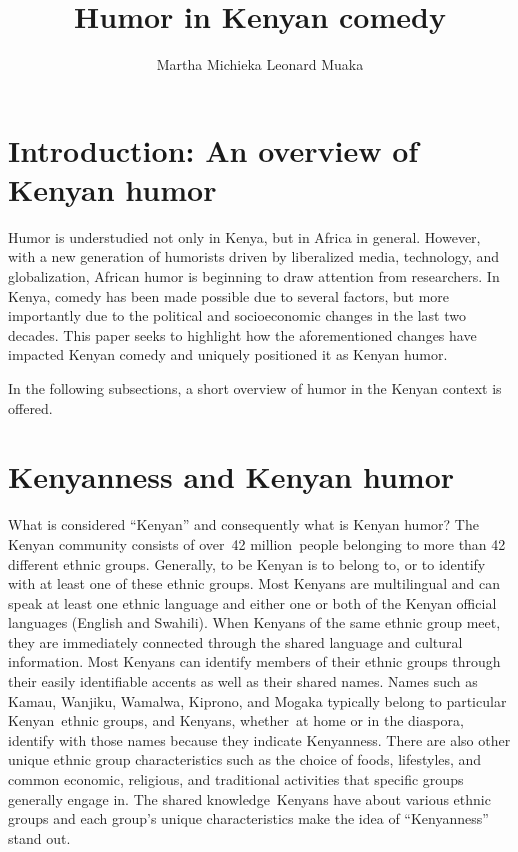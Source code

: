 \documentclass[output=paper]{langsci/langscibook}
\title{Humor in Kenyan comedy}
\author{%
 Martha Michieka   \affiliation{ East Tennessee State University}
 Leonard Muaka\affiliation{Winston Salem State University, North Carolina}\lastand 
}
\begin{document}
 

\section{ Introduction: An overview of Kenyan humor}

Humor is understudied not only in Kenya, but in Africa in general. However, with a new generation of humorists driven by liberalized media, technology, and globalization, African humor is beginning to draw attention from researchers. In Kenya, comedy has been made possible due to several factors, but more importantly due to the political and socioeconomic changes in the last two decades. This paper seeks to highlight how the aforementioned changes have impacted Kenyan comedy and uniquely positioned it as Kenyan humor. 

In the following subsections, a short overview of humor in the Kenyan context is offered.\textbf{ \\
}

\section{ Kenyanness and Kenyan humor\\
}
\begin{styleListParagraph}
What is considered “Kenyan” and consequently what is Kenyan humor? The Kenyan community consists of over~42 million~people belonging to more than 42 different ethnic groups. Generally, to be Kenyan is to belong to, or to identify with at least one of these ethnic groups. Most Kenyans are multilingual and can speak at least one ethnic language and either one or both of the Kenyan official languages (English and Swahili). When Kenyans of the same ethnic group meet, they are immediately connected through the shared language and cultural information. Most Kenyans can identify members of their ethnic groups through their easily identifiable accents as well as their shared names. Names such as Kamau, Wanjiku, Wamalwa, Kiprono, and Mogaka typically belong to particular Kenyan~ethnic groups, and Kenyans, whether~at home or in the diaspora, identify with those names because they indicate Kenyanness. There are also other unique ethnic group characteristics such as the choice of foods, lifestyles, and common economic, religious, and traditional activities that specific groups generally engage in. The shared knowledge~Kenyans have about various ethnic groups and each group’s unique characteristics make the idea of “Kenyanness” stand out.
\end{styleListParagraph}
\end{document}
